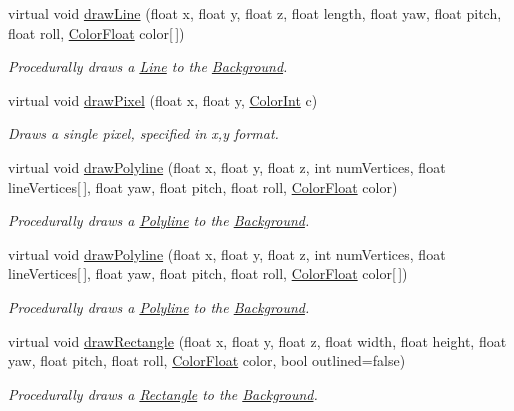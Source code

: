 \begin{DoxyCompactItemize}
virtual void \hyperlink{classtsgl_1_1_background_aacfe49f6cd5337abb4b52189c463ebd1}{draw\+Line} (float x, float y, float z, float length, float yaw, float pitch, float roll, \hyperlink{structtsgl_1_1_color_float}{Color\+Float} color\mbox{[}$\,$\mbox{]})
\begin{DoxyCompactList}\small\item\em Procedurally draws a \hyperlink{classtsgl_1_1_line}{Line} to the \hyperlink{classtsgl_1_1_background}{Background}. \end{DoxyCompactList}\item 
virtual void \hyperlink{classtsgl_1_1_background_acfeec27c6bcc851652725ddd9cc3d3c9}{draw\+Pixel} (float x, float y, \hyperlink{structtsgl_1_1_color_int}{Color\+Int} c)
\begin{DoxyCompactList}\small\item\em Draws a single pixel, specified in x,y format. \end{DoxyCompactList}\item 
virtual void \hyperlink{classtsgl_1_1_background_ad02a35859cd3d2d281f1edfaafe03cf7}{draw\+Polyline} (float x, float y, float z, int num\+Vertices, float line\+Vertices\mbox{[}$\,$\mbox{]}, float yaw, float pitch, float roll, \hyperlink{structtsgl_1_1_color_float}{Color\+Float} color)
\begin{DoxyCompactList}\small\item\em Procedurally draws a \hyperlink{classtsgl_1_1_polyline}{Polyline} to the \hyperlink{classtsgl_1_1_background}{Background}. \end{DoxyCompactList}\item 
virtual void \hyperlink{classtsgl_1_1_background_a04fda406cb24130cb15218923d0f29f5}{draw\+Polyline} (float x, float y, float z, int num\+Vertices, float line\+Vertices\mbox{[}$\,$\mbox{]}, float yaw, float pitch, float roll, \hyperlink{structtsgl_1_1_color_float}{Color\+Float} color\mbox{[}$\,$\mbox{]})
\begin{DoxyCompactList}\small\item\em Procedurally draws a \hyperlink{classtsgl_1_1_polyline}{Polyline} to the \hyperlink{classtsgl_1_1_background}{Background}. \end{DoxyCompactList}\item 
virtual void \hyperlink{classtsgl_1_1_background_a000e0dae1eb8ce6f80aac8c4e5fb1e80}{draw\+Rectangle} (float x, float y, float z, float width, float height, float yaw, float pitch, float roll, \hyperlink{structtsgl_1_1_color_float}{Color\+Float} color, bool outlined=false)
\begin{DoxyCompactList}\small\item\em Procedurally draws a \hyperlink{classtsgl_1_1_rectangle}{Rectangle} to the \hyperlink{classtsgl_1_1_background}{Background}. \end{DoxyCompactList}\item 

\end{DoxyCompactItemize}

